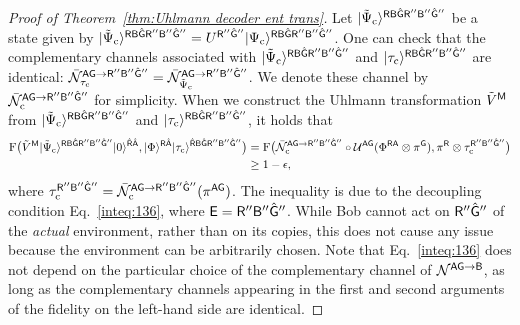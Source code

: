\begin{proof}[Proof of Theorem~\ref{thm:Uhlmann decoder ent trans}]
Let $\ket{\til{\Psi}_{\rm c}}^{\sR\sB\hat{\sG}\sR''\sB''\hat{\sG}''}$ be a state given by $\ket{\til{\Psi}_{\rm c}}^{\sR\sB\hat{\sG}\sR''\sB''\hat{\sG}''} = U^{\sR''\hat{\sG}''}\ket{\Psi_{\rm c}}^{\sR\sB\hat{\sG}\sR''\sB''\hat{\sG}''}$. One can check that the complementary channels associated with $\ket{\til{\Psi}_{\rm c}}^{\sR\sB\hat{\sG}\sR''\sB''\hat{\sG}''}$ and $\ket{\tau_{\rm c}}^{\sR\sB\hat{\sG}\sR''\sB''\hat{\sG}''}$ are identical: $\bar{\cN}_{\tau_{\rm c}}^{\sA\sG\rarr\sR''\sB''\hat{\sG}''} = \bar{\cN}_{\til{\Psi}_{\rm c}}^{\sA\sG\rarr\sR''\sB''\hat{\sG}''}$. We denote these channel by $\bar{\cN}_{\rm c}^{\sA\sG\rarr\sR''\sB''\hat{\sG}''}$ for simplicity.
When we construct the Uhlmann transformation $\til{V}^\sM$ from $\ket{\til{\Psi}_{\rm c}}^{\sR\sB\hat{\sG}\sR''\sB''\hat{\sG}''}$ and $\ket{\tau_{\rm c}}^{\sR\sB\hat{\sG}\sR''\sB''\hat{\sG}''}$, it holds that
\begin{align}
\label{inteq:68}
    \rF\big(\til{V}^\sM\ket{\til{\Psi}_{\rm c}}^{\sR\sB\hat{\sG}\sR''\sB''\hat{\sG}''}\ket{0}^{\hat{\sR}\hat{\sA}}, \ket{\Phi}^{\sR\hat{\sA}}\ket{\tau_{\rm c}}^{\hat{\sR}\sB\hat{\sG}\sR''\sB''\hat{\sG}''}\big)
    &= \rF\big(\bar{\cN}_{\rm c}^{\sA\sG\rarr\sR''\sB''\hat{\sG}''}\circ\cU^{\sA\sG}(\Phi^{\sR\sA} \otimes \pi^\sG), \pi^\sR\otimes \tau_{\rm c}^{\sR''\sB''\hat{\sG}''}\big) \\
    &\geq 1 -\epsilon,
\end{align}
where $\tau_{\rm c}^{\sR''\sB''\hat{\sG}''} = \bar{\cN}_{\rm c}^{\sA\sG\rarr\sR''\sB''\hat{\sG}''}(\pi^{\sA\sG})$.
The inequality is due to the decoupling condition Eq.~\eqref{inteq:136}, where $\sE = \sR''\sB''\hat{\sG}''$.
While Bob cannot act on $\sR''\hat{\sG}''$ of the \emph{actual} environment, rather than on its copies, this does not cause any issue because the environment can be arbitrarily chosen.
Note that Eq.~\eqref{inteq:136} does not depend on the particular choice of the complementary channel of $\cN^{\sA\sG\rarr\sB}$, as long as the complementary channels appearing in the first and second arguments of the fidelity on the left-hand side are identical.





\end{proof}
